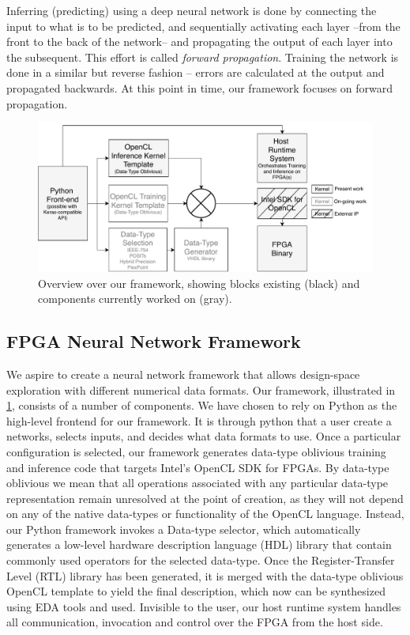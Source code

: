 \documentclass[techrep,english]{ipsj} %
\begin{document}
Inferring (predicting) using a deep neural network is done by connecting the input to what is to be predicted, and sequentially activating each layer --from the front to the back of the network-- and propagating the output of each layer into the subsequent.
This effort is called \textit{forward propagation}. Training the network is done in a similar but reverse fashion -- errors are calculated at the output and propagated backwards.
At this point in time, our framework focuses on forward propagation.

\begin{figure}[p]
  \centering
  \includegraphics[width=0.7\linewidth]{training_overview.pdf}
  \caption{Overview over our framework, showing blocks existing (black) and components currently worked on (gray).}\label{fig:overview}
\end{figure}

\subsection{FPGA Neural Network Framework}
We aspire to create a neural network framework that allows design-space exploration with different numerical data formats.
Our framework, illustrated in \cref{fig:overview}, consists of a number of components.
We have chosen to rely on Python as the high-level frontend for our framework.
It is through python that a user create a networks, selects inputs, and decides what data formats to use.
Once a particular configuration is selected, our framework generates data-type oblivious training and inference code that targets Intel's OpenCL SDK for FPGAs.
By data-type oblivious we mean that all operations associated with any particular data-type representation remain unresolved at the point of creation, as they will not depend on any of the native data-types or functionality of the OpenCL language.
Instead, our Python framework invokes a Data-type selector, which automatically generates a low-level hardware description language (HDL) library that contain commonly used operators for the selected data-type.
Once the Register-Transfer Level (RTL) library has been generated, it is merged with the data-type oblivious OpenCL template to yield the final description, which now can be synthesized using EDA tools and used.
Invisible to the user, our host runtime system handles all communication, invocation and control over the FPGA from the host side.
\end{document}
